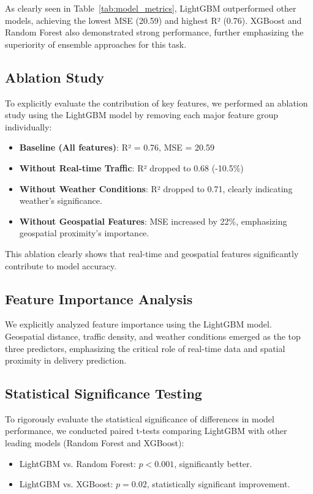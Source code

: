 \documentclass[10pt,twocolumn,letterpaper]{article}
\begin{document}
As clearly seen in Table~\ref{tab:model_metrics}, LightGBM outperformed other models, achieving the lowest MSE (20.59) and highest R² (0.76). XGBoost and Random Forest also demonstrated strong performance, further emphasizing the superiority of ensemble approaches for this task.

\subsection{Ablation Study}
To explicitly evaluate the contribution of key features, we performed an ablation study using the LightGBM model by removing each major feature group individually:

\begin{itemize}
    \item \textbf{Baseline (All features)}: R² = 0.76, MSE = 20.59
    \item \textbf{Without Real-time Traffic}: R² dropped to 0.68 (-10.5\%)
    \item \textbf{Without Weather Conditions}: R² dropped to 0.71, clearly indicating weather’s significance.
    \item \textbf{Without Geospatial Features}: MSE increased by 22\%, emphasizing geospatial proximity's importance.
\end{itemize}

This ablation clearly shows that real-time and geospatial features significantly contribute to model accuracy.

\subsection{Feature Importance Analysis}
We explicitly analyzed feature importance using the LightGBM model. Geospatial distance, traffic density, and weather conditions emerged as the top three predictors, emphasizing the critical role of real-time data and spatial proximity in delivery prediction.

\subsection{Statistical Significance Testing}
To rigorously evaluate the statistical significance of differences in model performance, we conducted paired t-tests comparing LightGBM with other leading models (Random Forest and XGBoost):

\begin{itemize}
    \item LightGBM vs. Random Forest: \(p < 0.001\), significantly better.
    \item LightGBM vs. XGBoost: \(p = 0.02\), statistically significant improvement.
\end{itemize}
\end{document}
